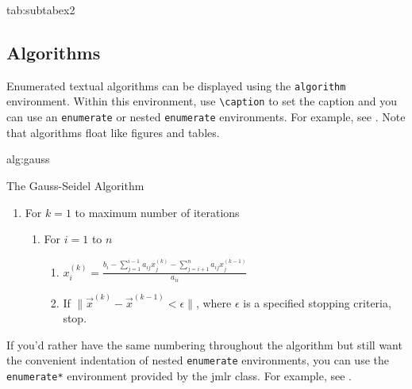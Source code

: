 \documentclass[pmlr,twocolumn,10pt]{jmlr} %
\begin{document}
\begin{table}[htbp]
\floatconts
 {tab:subtabex2}
 {\caption{Another Example With Sub-Tables}}
 {%
   \qquad
 }
\end{table}

\subsection{Algorithms}
\label{sec:algorithms}

Enumerated textual algorithms can be displayed using the
\texttt{algorithm} environment. Within this environment, use
\verb|\caption| to set the caption and you can use an
\texttt{enumerate} or nested \texttt{enumerate} environments.
For example, see . Note that algorithms
float like figures and tables.

\begin{algorithm}[htbp]
\floatconts
  {alg:gauss}%
  {\caption{The Gauss-Seidel Algorithm}}%
{%
\begin{enumerate}
  \item For $k=1$ to maximum number of iterations
    \begin{enumerate}
      \item For $i=1$ to $n$
        \begin{enumerate}
        \item $x_i^{(k)} = 
          \frac{b_i - \sum_{j=1}^{i-1}a_{ij}x_j^{(k)}
          - \sum_{j=i+1}^{n}a_{ij}x_j^{(k-1)}}{a_{ii}}$
        \item If $\|\vec{x}^{(k)}-\vec{x}^{(k-1)} < \epsilon\|$,
          where $\epsilon$ is a specified stopping criteria, stop.
      \end{enumerate}
    \end{enumerate}
\end{enumerate}
}%
\end{algorithm}

If you'd rather have the same numbering throughout the algorithm
but still want the convenient indentation of nested 
\texttt{enumerate} environments, you can use the
\texttt{enumerate*} environment provided by the \textsf{jmlr}
class. For example, see .
\end{document}
